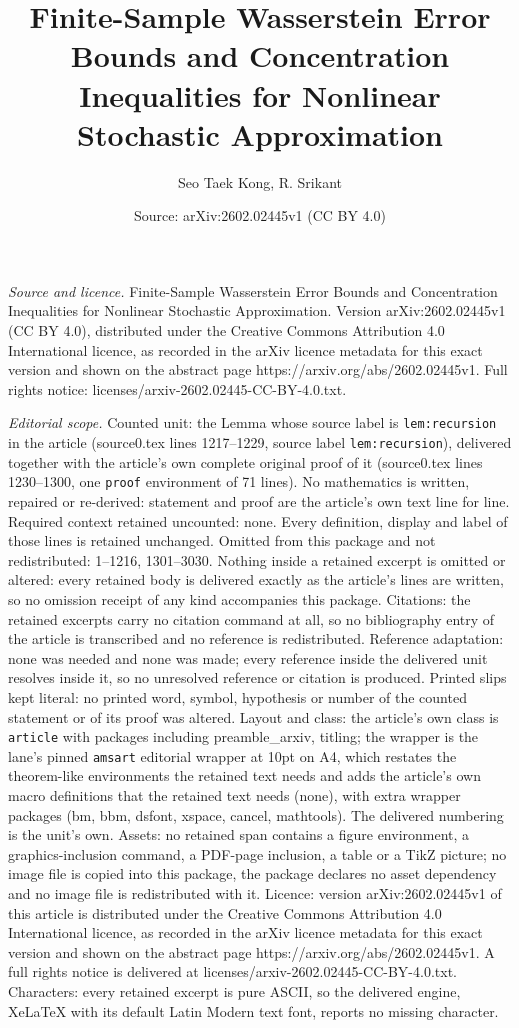 \documentclass[10pt,a4paper]{amsart}
\title[Finite-Sample Wasserstein Error Bounds and Concentration Ine]{Finite-Sample Wasserstein Error Bounds and Concentration Inequalities for Nonlinear Stochastic Approximation}
\author{Seo Taek Kong, R. Srikant}
\date{Source: arXiv:2602.02445v1 (CC BY 4.0)}
\begin{document}
\maketitle

\noindent\emph{Source and licence.} Finite-Sample Wasserstein Error Bounds and Concentration Inequalities for Nonlinear Stochastic Approximation. Version arXiv:2602.02445v1 (CC BY 4.0), distributed under the Creative Commons Attribution 4.0 International licence, as recorded in the arXiv licence metadata for this exact version and shown on the abstract page https://arxiv.org/abs/2602.02445v1. Full rights notice: licenses/arxiv-2602.02445-CC-BY-4.0.txt.\par\smallskip

\noindent\textit{Editorial scope.} Counted unit: the Lemma whose source label is \texttt{lem:recursion} in the article (source0.tex lines 1217--1229, source label \texttt{lem:recursion}), delivered together with the article's own complete original proof of it (source0.tex lines 1230--1300, one \texttt{proof} environment of 71 lines). No mathematics is written, repaired or re-derived: statement and proof are the article's own text line for line. Required context retained uncounted: none. Every definition, display and label of those lines is retained unchanged. Omitted from this package and not redistributed: 1--1216, 1301--3030. Nothing inside a retained excerpt is omitted or altered: every retained body is delivered exactly as the article's lines are written, so no omission receipt of any kind accompanies this package. Citations: the retained excerpts carry no citation command at all, so no bibliography entry of the article is transcribed and no reference is redistributed. Reference adaptation: none was needed and none was made; every reference inside the delivered unit resolves inside it, so no unresolved reference or citation is produced. Printed slips kept literal: no printed word, symbol, hypothesis or number of the counted statement or of its proof was altered. Layout and class: the article's own class is \texttt{article} with packages including preamble\_arxiv, titling; the wrapper is the lane's pinned \texttt{amsart} editorial wrapper at 10pt on A4, which restates the theorem-like environments the retained text needs and adds the article's own macro definitions that the retained text needs (none), with extra wrapper packages (bm, bbm, dsfont, xspace, cancel, mathtools). The delivered numbering is the unit's own. Assets: no retained span contains a figure environment, a graphics-inclusion command, a PDF-page inclusion, a table or a TikZ picture; no image file is copied into this package, the package declares no asset dependency and no image file is redistributed with it. Licence: version arXiv:2602.02445v1 of this article is distributed under the Creative Commons Attribution 4.0 International licence, as recorded in the arXiv licence metadata for this exact version and shown on the abstract page https://arxiv.org/abs/2602.02445v1. A full rights notice is delivered at licenses/arxiv-2602.02445-CC-BY-4.0.txt. Characters: every retained excerpt is pure ASCII, so the delivered engine, XeLaTeX with its default Latin Modern text font, reports no missing character.
\end{document}
